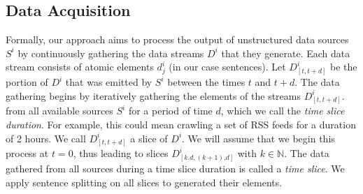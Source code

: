 \documentclass[a4paper]{llncs}
\begin{document}
\subsection{Data Acquisition}
\label{subsec:prerequisites}
Formally, our approach aims to process the output of unstructured data sources $S^i$ by continuously gathering the data streams $D^i$ that they generate.
Each data stream consists of atomic elements $d^i_j$ (in our case sentences).
Let $D^i_{[t, t+d]}$ be the portion of $D^i$ that was emitted by $S^i$ between the times $t$ and $t+d$.
The data gathering begins by iteratively gathering the elements of the streams $D^i_{[t, t+d]}$. from all available sources $S^i$ for a period of time $d$, which we call the \emph{time slice duration}.
For example, this could mean crawling a set of RSS feeds for a duration of 2 hours.
We call $D^i_{[t, t+d]}$ a slice of $D^i$.
We will assume that we begin this process at $t=0$, thus leading to slices $D^i_{[k.d, (k+1).d]}$ with $k \in \mathbb{N}$.
The data gathered from all sources during a time slice duration is called a \emph{time slice}.
We apply sentence splitting on all slices to generated their elements. %

\end{document}
